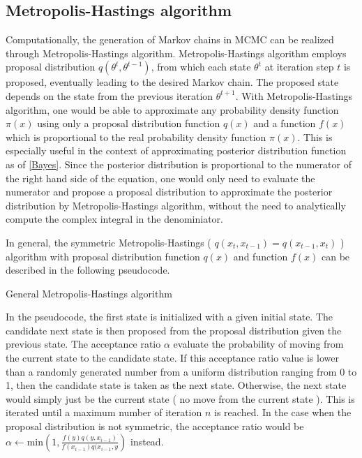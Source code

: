 \documentclass{usiinftr}
\begin{document}
\subsection{Metropolis-Hastings algorithm}
Computationally, the generation of Markov chains in MCMC can be realized through Metropolis-Hastings algorithm. Metropolis-Hastings algorithm employs proposal distribution $q(\theta^{t},\theta^{t-1})$, from which each state $\theta^{t}$ at iteration step $t$ is proposed, eventually leading to the desired Markov chain. The proposed state depends on the state from the previous iteration $\theta^{t+1}$. With Metropolis-Hastings algorithm, one would be able to approximate any probability density function $\pi(x)$ using only a proposal distribution function $q(x)$ and a function $f(x)$ which is proportional to the real probability density function $\pi(x)$.  This is especially useful in the context of approximating posterior distribution function as of \ref{Bayes}. Since the posterior distribution is proportional to the numerator of the right hand side of the equation, one would only need to evaluate the numerator and propose a proposal distribution to approximate the posterior distribution by Metropolis-Hastings algorithm, without the need to analytically compute the complex integral in the denominiator.

In general, the symmetric Metropolis-Hastings ( $q(x_t,x_{t-1}) = q(x_{t-1},x_t)$ ) algorithm with proposal distribution function $q(x)$ and function $f(x)$ can be described in the following pseudocode.

\begin{algorithm}
  \caption{General Metropolis-Hastings algorithm} \label{algMH}
  \begin{algorithmic}[1]
    \Statex
        \Else
        \EndIf
    \EndFor
    \State {}
    \EndFunction
  \end{algorithmic}
\end{algorithm}

In the pseudocode, the first state is initialized with a given initial state. The candidate next state is then proposed from the proposal distribution given the previous state. The acceptance ratio $\alpha$ evaluate the probability of moving from the current state to the candidate state. If this acceptance ratio value is lower than a randomly generated number from a uniform distribution ranging from 0 to 1, then the candidate state is taken as the next state. Otherwise, the next state would simply just be the current state ( no move from the current state ). This is iterated until a maximum number of iteration $n$ is reached. In the case when the proposal distribution is not symmetric, the acceptance ratio would be $ \alpha \gets \textrm{min}\left(1, \frac{f(y)q(y,x_{i-1})}{f(x_{i-1})q(x_{i-1},y}\right)$ instead. 
\end{document}
